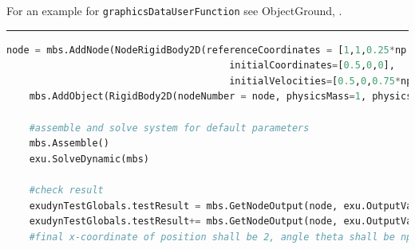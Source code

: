     For an example for \texttt{graphicsDataUserFunction} see ObjectGround, .
    \finishTable
\vspace{6pt}\par\noindent\rule{\textwidth}{0.4pt}
\label{miniExample_ObjectRigidBody2D}
\pythonstyle
\begin{lstlisting}[language=Python, firstnumber=1]
    node = mbs.AddNode(NodeRigidBody2D(referenceCoordinates = [1,1,0.25*np.pi], 
                                       initialCoordinates=[0.5,0,0],
                                       initialVelocities=[0.5,0,0.75*np.pi]))
    mbs.AddObject(RigidBody2D(nodeNumber = node, physicsMass=1, physicsInertia=2))

    #assemble and solve system for default parameters
    mbs.Assemble()
    exu.SolveDynamic(mbs)

    #check result
    exudynTestGlobals.testResult = mbs.GetNodeOutput(node, exu.OutputVariableType.Position)[0]
    exudynTestGlobals.testResult+= mbs.GetNodeOutput(node, exu.OutputVariableType.Coordinates)[2]
    #final x-coordinate of position shall be 2, angle theta shall be np.pi

\end{lstlisting}


